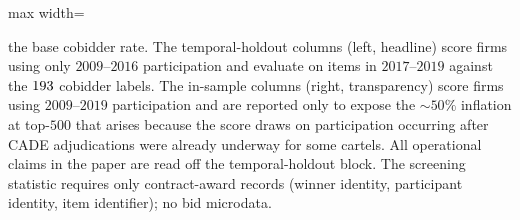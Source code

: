 \begin{table}[htbp]
\begin{adjustbox}{max width=\textwidth}
\begin{threeparttable}
\begin{tablenotes}
the base cobidder rate. The temporal-holdout columns (left, headline)
score firms using only $2009$--$2016$ participation and evaluate on
items in $2017$--$2019$ against the $193$ cobidder labels.
The in-sample columns (right, transparency) score firms using
$2009$--$2019$ participation and are reported only to expose the
$\sim\!50\%$ inflation at top-$500$ that arises because the score
draws on participation occurring after CADE adjudications were already
underway for some cartels. All operational claims in the paper are
read off the temporal-holdout block. The screening statistic
requires only contract-award records (winner identity, participant
identity, item identifier); no bid microdata.
\end{tablenotes}
\end{threeparttable}
\end{adjustbox}
\end{table}
